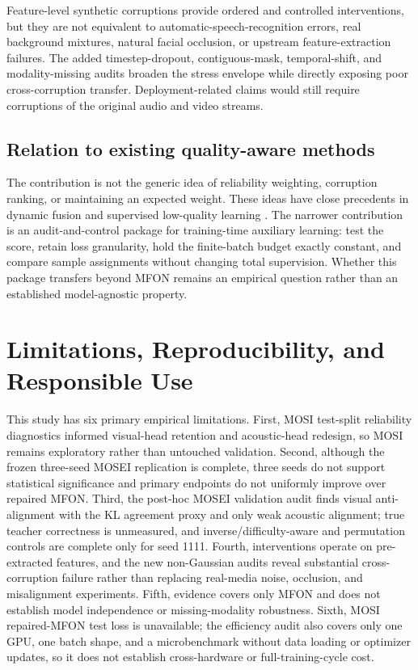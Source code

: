 Feature-level synthetic corruptions provide ordered and controlled
interventions, but they are not equivalent to automatic-speech-recognition
errors, real background mixtures, natural facial occlusion, or upstream
feature-extraction failures. The added timestep-dropout, contiguous-mask,
temporal-shift, and modality-missing audits broaden the stress envelope while
directly exposing poor cross-corruption transfer. Deployment-related claims
would still require corruptions of the original audio and video streams.

\subsection{Relation to existing quality-aware
methods}\label{relation-to-existing-quality-aware-methods}

The contribution is not the generic idea of reliability weighting,
corruption ranking, or maintaining an expected weight. These ideas have
close precedents in dynamic fusion and supervised low-quality learning
\cite{zhang2023qmf, mai2025samlml}. The narrower contribution is an
audit-and-control package for training-time auxiliary learning: test the
score, retain loss granularity, hold the finite-batch budget exactly
constant, and compare sample assignments without changing total
supervision. Whether this package transfers beyond MFON remains an
empirical question rather than an established model-agnostic property.

\section{Limitations, Reproducibility, and Responsible
Use}\label{limitations-reproducibility-and-responsible-use}

This study has six primary empirical limitations. First, MOSI test-split
reliability diagnostics informed visual-head retention and acoustic-head
redesign, so MOSI remains exploratory rather than untouched validation.
Second, although the frozen three-seed MOSEI replication is complete, three
seeds do not support statistical significance and primary endpoints do not
uniformly improve over repaired MFON. Third, the post-hoc MOSEI validation
audit finds visual anti-alignment with the KL agreement proxy and only weak
acoustic alignment; true teacher correctness is unmeasured, and
inverse/difficulty-aware and permutation controls are
complete only for seed 1111. Fourth, interventions operate on pre-extracted
features, and the new non-Gaussian audits reveal substantial cross-corruption
failure rather than replacing real-media noise, occlusion, and misalignment
experiments. Fifth, evidence covers only MFON and does not establish model
independence or missing-modality robustness. Sixth, MOSI repaired-MFON test
loss is unavailable; the efficiency audit also covers only one GPU, one batch
shape, and a microbenchmark without data loading or optimizer updates, so it
does not establish cross-hardware or full-training-cycle cost.

